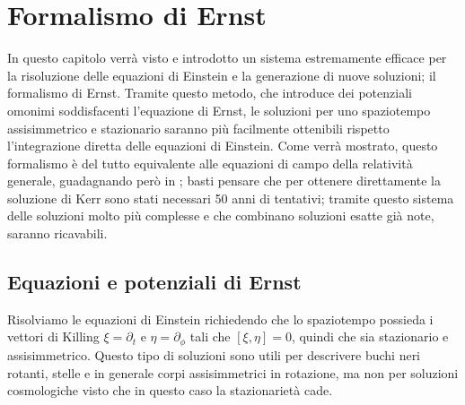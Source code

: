 \chapter{Formalismo di Ernst}
In questo capitolo verrà visto e introdotto un sistema estremamente efficace per la risoluzione delle equazioni di Einstein e la generazione di nuove soluzioni; il formalismo di Ernst. Tramite questo metodo, che introduce dei potenziali omonimi soddisfacenti l'equazione di Ernst, le soluzioni per uno spaziotempo assisimmetrico e stazionario saranno più facilmente ottenibili rispetto l'integrazione diretta delle equazioni di Einstein. Come verrà mostrato, questo formalismo è del tutto equivalente alle equazioni di campo della relatività generale, guadagnando però in ; basti pensare che per ottenere direttamente la soluzione di Kerr sono stati necessari 50 anni di tentativi; tramite questo sistema delle soluzioni molto più complesse e che combinano soluzioni esatte già note, saranno ricavabili.

\section{Equazioni e potenziali di Ernst}
Risolviamo le equazioni di Einstein richiedendo che lo spaziotempo possieda i vettori di Killing $\xi = \partial_t$ e $\eta = \partial_\phi$ tali che $[\xi, \eta] = 0$, quindi che sia stazionario e assisimmetrico. Questo tipo di soluzioni sono utili per descrivere buchi neri rotanti, stelle e in generale corpi assisimmetrici in rotazione, ma non per soluzioni cosmologiche visto che in questo caso la stazionarietà cade.

